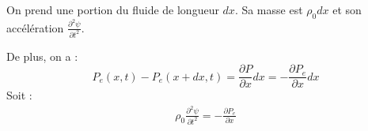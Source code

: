 On prend une portion du fluide de longueur $dx$. Sa masse est $\rho_{0}dx$ et son accélération $\frac{\partial^{2} \psi}{\partial t^{2}}$. \newline

De plus, on a : 
\begin{equation}
    P_{e}(x,t) - P_{e}(x + dx,t) = \frac{\partial P}{\partial x}dx = -\frac{\partial P_{e}}{\partial x}dx \nonumber
\end{equation}
Soit : 
\begin{eqnarray}
    \rho_{0}\frac{\partial^{2} \psi}{\partial t^{2}} = - \frac{\partial P_{e}}{\partial x}\nonumber
\end{eqnarray}